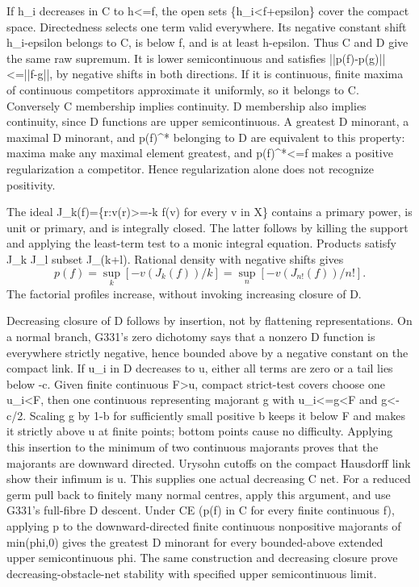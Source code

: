 \documentclass[11pt]{article}
\begin{document}
If h\_i decreases in C to h<=f, the open sets \{h\_i<f+epsilon\} cover the compact space. Directedness selects one term valid everywhere. Its negative constant shift h\_i-epsilon belongs to C, is below f, and is at least h-epsilon. Thus C and D give the same raw supremum. It is lower semicontinuous and satisfies ||p(f)-p(g)||<=||f-g||, by negative shifts in both directions. If it is continuous, finite maxima of continuous competitors approximate it uniformly, so it belongs to C. Conversely C membership implies continuity. D membership also implies continuity, since D functions are upper semicontinuous. A greatest D minorant, a maximal D minorant, and p(f)\textasciicircum{}* belonging to D are equivalent to this property: maxima make any maximal element greatest, and p(f)\textasciicircum{}*<=f makes a positive regularization a competitor. Hence regularization alone does not recognize positivity.

The ideal J\_k(f)=\{r:v(r)>=-k f(v) for every v in X\} contains a primary power, is unit or primary, and is integrally closed. The latter follows by killing the support and applying the least-term test to a monic integral equation. Products satisfy J\_k J\_l subset J\_(k+l). Rational density with negative shifts gives
\[
p(f)=\sup_k[-v(J_k(f))/k]=\sup_n[-v(J_{n!}(f))/n!].
\]
The factorial profiles increase, without invoking increasing closure of D.

Decreasing closure of D follows by insertion, not by flattening representations. On a normal branch, G331's zero dichotomy says that a nonzero D function is everywhere strictly negative, hence bounded above by a negative constant on the compact link. If u\_i in D decreases to u, either all terms are zero or a tail lies below -c. Given finite continuous F>u, compact strict-test covers choose one u\_i<F, then one continuous representing majorant g with u\_i<=g<F and g<-c/2. Scaling g by 1-b for sufficiently small positive b keeps it below F and makes it strictly above u at finite points; bottom points cause no difficulty. Applying this insertion to the minimum of two continuous majorants proves that the majorants are downward directed. Urysohn cutoffs on the compact Hausdorff link show their infimum is u. This supplies one actual decreasing C net. For a reduced germ pull back to finitely many normal centres, apply this argument, and use G331's full-fibre D descent. Under CE (p(f) in C for every finite continuous f), applying p to the downward-directed finite continuous nonpositive majorants of min(phi,0) gives the greatest D minorant for every bounded-above extended upper semicontinuous phi. The same construction and decreasing closure prove decreasing-obstacle-net stability with specified upper semicontinuous limit.
\end{document}
